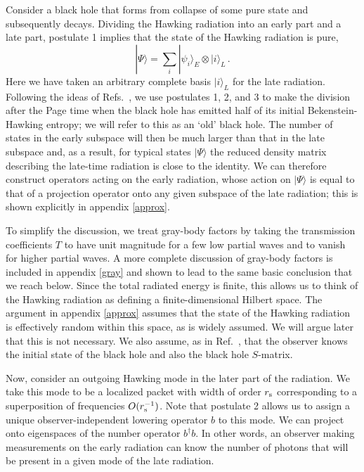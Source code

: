 \documentclass[12pt]{article}
\begin{document}
Consider a black hole that forms from collapse of some pure state and subsequently decays.  Dividing the Hawking radiation into an early part and a late part, postulate 1 implies that the state of the Hawking radiation is pure,
\begin{equation}
\label{Hstate}
|\Psi\rangle = \sum_i |\psi_i\rangle_E \otimes |i\rangle_L \,.
\end{equation}
Here we have taken
an arbitrary complete basis $|i\rangle_L$ for the late radiation.  Following the ideas of Refs.~\cite{Page:1993df,Hayden:2007cs}, we {use postulates 1, 2, and 3 to} make the division after the Page time when the black hole has emitted half of its initial Bekenstein-Hawking entropy; we will refer to this as an `old' black hole.  The number of states in the early subspace will then be much larger than that in the late
subspace and, as a result,  for typical states $|\Psi\rangle$ the reduced density matrix describing the late-time radiation is close to { the identity}. We can therefore construct operators acting
on the early radiation, whose action on $|\Psi \rangle$ is equal to that of a projection operator onto
any given subspace of the late radiation; this is shown explicitly in
appendix \ref{approx}.

{To simplify the discussion, we treat gray-body factors by taking the transmission coefficients $T$ to have unit magnitude  for a few low partial waves and to vanish for higher partial waves.  A more complete discussion of gray-body factors is included in appendix \ref{gray} and shown to lead to the same basic conclusion that we reach below. Since the total radiated energy is finite, this allows us to think of the Hawking radiation as defining a finite-dimensional Hilbert space. The argument in appendix \ref{approx} assumes that the state of the Hawking radiation is effectively random within this space, as is widely assumed.  We will argue later that this is not necessary.  We also assume, as in Ref.~\cite{Hayden:2007cs}, that the observer knows the initial state of the black hole and also the black hole $S$-matrix.}


Now, consider an outgoing Hawking mode in the later part of the radiation.  We take this mode to be a localized packet with width of order $r_{\rm s}$ corresponding to a superposition of frequencies $O(r_{\rm s}^{-1})$.  {Note that postulate 2 allows us to assign a unique observer-independent lowering operator $b$ to this mode.}   We can project onto eigenspaces of the number operator $b^\dagger b$.  In other words, an observer making measurements on the early radiation can know the number of photons that will be present in a given mode of the late radiation.
\end{document}

